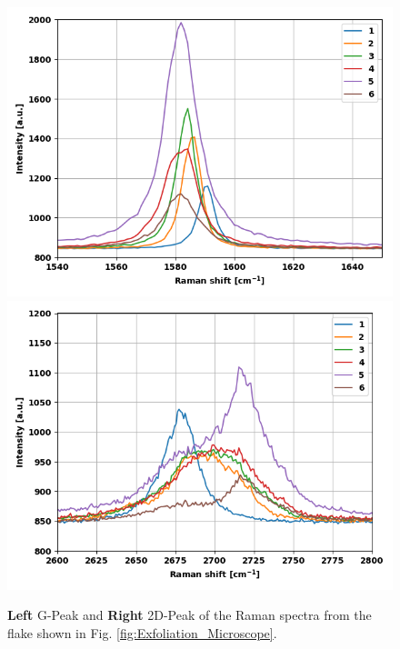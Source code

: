 \documentclass[12pt,a4paper]{article}
\begin{document}
\begin{figure}
\centering
\includegraphics[scale=0.5]{Bilder/Exfoliation/2_mono_bi_tri_flake_G_peaks.PNG}
\includegraphics[scale=0.5]{Bilder/Exfoliation/2_mono_bi_tri_flake_2D_peaks.PNG}
\caption{\textbf{Left} G-Peak and \textbf{Right} 2D-Peak of the Raman spectra from the flake shown in Fig. \ref{fig:Exfoliation_Microscope}.}
\label{fig:Exfoliation_Peaks}
\end{figure}
\end{document}
